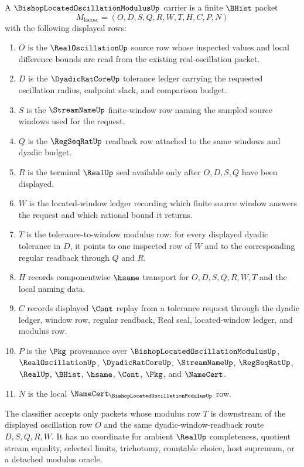 \begin{definition}
\label{def:bishop-located-oscillation-modulus-carrier}
A $\BishopLocatedOscillationModulusUp$ carrier is a finite $\BHist$ packet
$$
M_{\mathrm{locosc}}=(O,D,S,Q,R,W,T,H,C,P,N)
$$
with the following displayed rows:
\begin{enumerate}
\item $O$ is the $\RealOscillationUp$ source row whose inspected values and local difference bounds are read from the existing real-oscillation packet.
\item $D$ is the $\DyadicRatCoreUp$ tolerance ledger carrying the requested oscillation radius, endpoint slack, and comparison budget.
\item $S$ is the $\StreamNameUp$ finite-window row naming the sampled source windows used for the request.
\item $Q$ is the $\RegSeqRatUp$ readback row attached to the same windows and dyadic budget.
\item $R$ is the terminal $\RealUp$ seal available only after $O,D,S,Q$ have been displayed.
\item $W$ is the located-window ledger recording which finite source window answers the request and which rational bound it returns.
\item $T$ is the tolerance-to-window modulus row: for every displayed dyadic tolerance in $D$, it points to one inspected row of $W$ and to the corresponding regular readback through $Q$ and $R$.
\item $H$ records componentwise $\hsame$ transport for $O,D,S,Q,R,W,T$ and the local naming data.
\item $C$ records displayed $\Cont$ replay from a tolerance request through the dyadic ledger, window row, regular readback, Real seal, located-window ledger, and modulus row.
\item $P$ is the $\Pkg$ provenance over $\BishopLocatedOscillationModulusUp$, $\RealOscillationUp$, $\DyadicRatCoreUp$, $\StreamNameUp$, $\RegSeqRatUp$, $\RealUp$, $\BHist$, $\hsame$, $\Cont$, $\Pkg$, and $\NameCert$.
\item $N$ is the local $\NameCert_{\BishopLocatedOscillationModulusUp}$ row.
\end{enumerate}
The classifier accepts only packets whose modulus row $T$ is downstream of the displayed oscillation row $O$ and the same dyadic-window-readback route $D,S,Q,R,W$. It has no coordinate for ambient $\RealUp$ completeness, quotient stream equality, selected limits, trichotomy, countable choice, host supremum, or a detached modulus oracle.
\end{definition}

